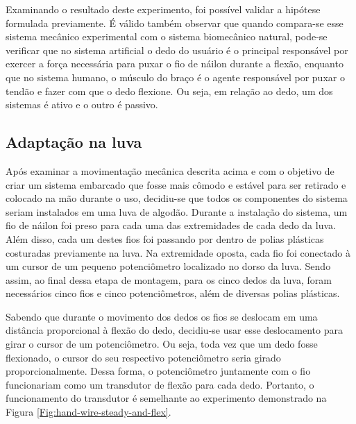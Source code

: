 \documentclass[
	12pt,				%
	openright,			%
	oneside,			%
	a4paper,			%
	english,			%
	brazil				%
	]{abntex2}
\begin{document}
		Examinando o resultado deste experimento, foi possível validar a hipótese formulada previamente. É válido também observar que quando compara-se esse sistema mecânico experimental com o sistema biomecânico natural, pode-se verificar que no sistema artificial o dedo do usuário é o principal responsável por exercer a força necessária para puxar o fio de náilon durante a flexão, enquanto que no sistema humano, o músculo do braço é o agente responsável por puxar o tendão e fazer com que o dedo flexione. Ou seja, em relação ao dedo, um dos sistemas é ativo e o outro é passivo.


		\subsection{Adaptação na luva} \label{sub:adaptacao-na-luva}





		Após examinar a movimentação mecânica descrita acima e com o objetivo de criar um sistema embarcado que fosse mais cômodo e estável para ser retirado e colocado na mão durante o uso, decidiu-se que todos os componentes do sistema seriam instalados em uma luva de algodão. Durante a instalação do sistema, um fio de náilon foi preso para cada uma das extremidades de cada dedo da luva. Além disso, cada um destes fios foi passando por dentro de polias plásticas costuradas previamente na luva. Na extremidade oposta, cada fio foi conectado à um cursor de um pequeno potenciômetro localizado no dorso da luva. Sendo assim, ao final dessa etapa de montagem, para os cinco dedos da luva, foram necessários cinco fios e cinco potenciômetros, além de diversas polias plásticas.

		Sabendo que durante o movimento dos dedos os fios se deslocam em uma distância proporcional à flexão do dedo, decidiu-se usar esse deslocamento para girar o cursor de um potenciômetro. Ou seja, toda vez que um dedo fosse flexionado, o cursor do seu respectivo potenciômetro seria girado proporcionalmente. Dessa forma, o potenciômetro juntamente com o fio funcionariam como um transdutor de flexão para cada dedo. Portanto, o funcionamento do transdutor é semelhante ao experimento demonstrado na Figura \ref{Fig:hand-wire-steady-and-flex}. 
		
\end{document}
